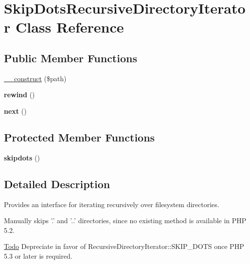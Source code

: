 \hypertarget{classSkipDotsRecursiveDirectoryIterator}{
\section{SkipDotsRecursiveDirectoryIterator Class Reference}
\label{classSkipDotsRecursiveDirectoryIterator}
}
\subsection*{Public Member Functions}
\begin{DoxyCompactItemize}
\item 
\hyperlink{classSkipDotsRecursiveDirectoryIterator_a88cbeecb3801d63b0a6cb15e1d7445a1}{\_\-\_\-construct} (\$path)
\item 
\hypertarget{classSkipDotsRecursiveDirectoryIterator_ac275ac0b1165256353b5465a22f7fce1}{
{\bfseries rewind} ()}
\label{classSkipDotsRecursiveDirectoryIterator_ac275ac0b1165256353b5465a22f7fce1}

\item 
\hypertarget{classSkipDotsRecursiveDirectoryIterator_a663a851362654c814a94917b0088761d}{
{\bfseries next} ()}
\label{classSkipDotsRecursiveDirectoryIterator_a663a851362654c814a94917b0088761d}

\end{DoxyCompactItemize}
\subsection*{Protected Member Functions}
\begin{DoxyCompactItemize}
\item 
\hypertarget{classSkipDotsRecursiveDirectoryIterator_a7a91d062f4adc1c2d7f3b973dc047873}{
{\bfseries skipdots} ()}
\label{classSkipDotsRecursiveDirectoryIterator_a7a91d062f4adc1c2d7f3b973dc047873}

\end{DoxyCompactItemize}


\subsection{Detailed Description}
Provides an interface for iterating recursively over filesystem directories.

Manually skips '.' and '..' directories, since no existing method is available in PHP 5.2.

\begin{Desc}
\item[\hyperlink{todo__todo000005}{Todo}]Depreciate in favor of RecursiveDirectoryIterator::SKIP\_\-DOTS once PHP 5.3 or later is required. \end{Desc}


